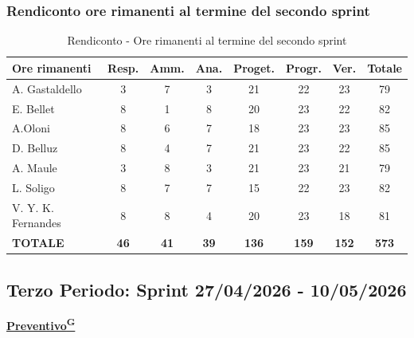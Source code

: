 \documentclass[a4paper,12pt]{article}
\providecommand{\glslink}[2]{\href{https://alittlebyte-19.github.io/Documentazione/glossario.html\#gls-#1}{\underline{#2}\textsuperscript{\scriptsize G}}}
\begin{document}
\subsubsection{Rendiconto ore rimanenti al termine del secondo sprint}
\begin{table}[htbp]
\centering
\renewcommand{\arraystretch}{1.5} 
\begin{tabularx}{\textwidth}{|X|c|c|c|c|c|c|c|}
\hline
\textbf{Ore rimanenti} & \textbf{Resp.} & \textbf{Amm.} & \textbf{Ana.} & \textbf{Proget.} & \textbf{Progr.} & \textbf{Ver.} & \textbf{Totale} \\
\hline
A. Gastaldello & 3 & 7 & 3 & 21 & 22 & 23 & 79 \\
\hline
E. Bellet & 8 & 1 & 8 & 20 & 23 & 22 & 82 \\
\hline
A.Oloni & 8 & 6 & 7 & 18 & 23 & 23 & 85 \\
\hline
D. Belluz & 8 & 4 & 7 & 21 & 23 & 22 & 85 \\
\hline
A. Maule & 3 & 8 & 3 & 21 & 23 & 21 & 79 \\
\hline
L. Soligo & 8 & 7 & 7 & 15 & 22 & 23 & 82 \\
\hline
V. Y. K. Fernandes & 8 & 8 & 4 & 20 & 23 & 18 & 81 \\
\hline
\rowcolor{gray!20}
\textbf{TOTALE} & \textbf{46} & \textbf{41} & \textbf{39} & \textbf{136} & \textbf{159} & \textbf{152} & \textbf{573} \\
\hline
\end{tabularx}
\caption{Rendiconto - Ore rimanenti al termine del secondo sprint}
\end{table}

\newpage

\subsection{Terzo Periodo: Sprint 27/04/2026 - 10/05/2026}
\label{sec:pec_terzoperiodo}

\vspace{0.5em}

\begin{center}
\noindent\textbf{\glslink{preventivo}{Preventivo}}
\end{center}
\end{document}
